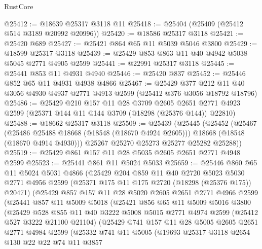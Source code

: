 \begin{lexlean}{RustCore}
\begin{coremodule}
@25412 := @18639 @25317 @3118 @11
@25418 := @25404 (@25409 (@25412 @514 @3189 @20992 @20996))
@25420 := @18586 @25317 @3118
@25421 := @25420 @689
@25427 := @25421 @864 @65 @11 @5039 @5046 @3800
@25429 := @18599 @25317 @3118
@25439 := @25429 @853 @863 @11 @40 @4942 @5038 @5045 @2771 @4905 @2599
@25441 := @22991 @25317 @3118
@25445 := @25441 @853 @11 @4931 @4940
@25446 := @25420 @837
@25452 := @25446 @852 @65 @11 @4931 @4938 @4866
@25467 := @25429
    @377
    @212
    @11
    @40
    @3056
    @4930
    @4937
    @2771
    @4913
    @2599
    (@25412 @376 @3056 @18792 @18796)
@25486 := @25429
    @210
    @157
    @11
    @28
    @3709
    @2605
    @2651
    @2771
    @4923
    @2599
    (@25371 @144 @11 @144 @3709 (@18298 (@25376 @144)) @22810)
@25488 := @18662 @25317 @3118
@25509 := @25439
    (@25445
      (@25452
        (@25467
          (@25486 @25488 @18668 (@18548 (@18670 @4924 @2605)))
          @18668
          (@18548 (@18670 @4914 @4930)))
        @25267
        @25270
        @25273
        @25277
        @25282
        @25288))
@25519 := @25429 @861 @157 @11 @28 @5035 @2605 @2651 @2771 @4948 @2599
@25523 := @25441 @861 @11 @5024 @5033
@25659 := @25446
    @860
    @65
    @11
    @5024
    @5031
    @4866
    (@25429
      @204
      @859
      @11
      @40
      @2720
      @5023
      @5030
      @2771
      @4956
      @2599
      (@25371 @175 @11 @175 @2720 (@18298 (@25376 @175)) @20471)
      (@25429
        @857
        @157
        @11
        @28
        @5020
        @2605
        @2651
        @2771
        @4966
        @2599
        (@25441
          @857
          @11
          @5009
          @5018
          (@25421
            @856
            @65
            @11
            @5009
            @5016
            @3800
            (@25429
              @528
              @855
              @11
              @40
              @3222
              @5008
              @5015
              @2771
              @4974
              @2599
              (@25412 @527 @3222 @21100 @21104)
              (@25429
                @741
                @157
                @11
                @28
                @5005
                @2605
                @2651
                @2771
                @4984
                @2599
                (@25332
                  @741
                  @11
                  @5005
                  (@19693
                    @25317
                    @3118
                    @2654
                    @130
                    @22
                    @22
                    @74
                    @11
                    @3857

\end{coremodule}
\end{lexlean}
